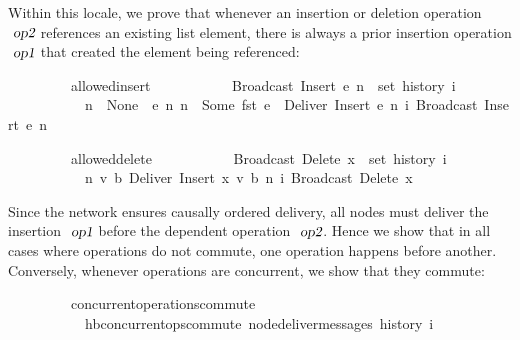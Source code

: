 Within this locale, we prove that whenever an insertion or deletion operation $\isa{op2}$ references an existing list element, there is always a prior insertion operation $\isa{op1}$ that created the element being referenced:
\vspace{0.275em}
\begin{isabellebody}
\ \ \ \ \ \ \ \ \ allowed{\isacharunderscore}insert{\isacharcolon}\isanewline
\ \ \ \ \ \ \ \ \ \ \ {\isachardoublequoteopen}Broadcast\ {\isacharparenleft}Insert\ e\ n{\isacharparenright}\ {\isasymin}\ set\ {\isacharparenleft}history\ i{\isacharparenright}{\isachardoublequoteclose}\isanewline
\ \ \ \ \ \ \ \ \ \ \ {\isachardoublequoteopen}n\ {\isacharequal}\ None\ {\isasymor}\ {\isacharparenleft}{\isasymexists}e{\isacharprime}\ n{\isacharprime}{\isachardot}\ n\ {\isacharequal}\ Some\ {\isacharparenleft}fst\ e{\isacharprime}{\isacharparenright}\ {\isasymand}\ Deliver\ {\isacharparenleft}Insert\ e{\isacharprime}\ n{\isacharprime}{\isacharparenright}\ {\isasymsqsubset}\isactrlsup i\ Broadcast\ {\isacharparenleft}Insert\ e\ n{\isacharparenright}{\isacharparenright}{\isachardoublequoteclose}
\end{isabellebody}
\vspace{0.275em}
\begin{isabellebody}
\ \ \ \ \ \ \ \ \ allowed{\isacharunderscore}delete{\isacharcolon}\isanewline
\ \ \ \ \ \ \ \ \ \ \ {\isachardoublequoteopen}Broadcast\ {\isacharparenleft}Delete\ x{\isacharparenright}\ {\isasymin}\ set\ {\isacharparenleft}history\ i{\isacharparenright}{\isachardoublequoteclose}\isanewline
\ \ \ \ \ \ \ \ \ \ \ {\isachardoublequoteopen}{\isasymexists}n{\isacharprime}\ v\ b{\isachardot}\ Deliver\ {\isacharparenleft}Insert\ {\isacharparenleft}x{\isacharcomma}\ v{\isacharcomma}\ b{\isacharparenright}\ n{\isacharprime}{\isacharparenright}\ {\isasymsqsubset}\isactrlsup i\ Broadcast\ {\isacharparenleft}Delete\ x{\isacharparenright}{\isachardoublequoteclose}
\end{isabellebody}
\vspace{0.275em}
Since the network ensures causally ordered delivery, all nodes must deliver the insertion $\isa{op1}$ before the dependent operation $\isa{op2}$.
Hence we show that in all cases where operations do not commute, one operation happens before another.
Conversely, whenever operations are concurrent, we show that they commute:
\vspace{0.275em}
\begin{isabellebody}
\ \ \ \ \ \ \ \ \ concurrent{\isacharunderscore}operations{\isacharunderscore}commute{\isacharcolon}\isanewline
\ \ \ \ \ \ \ \ \ \ \ {\isachardoublequoteopen}hb{\isachardot}concurrent{\isacharunderscore}ops{\isacharunderscore}commute\ {\isacharparenleft}node{\isacharunderscore}deliver{\isacharunderscore}messages\ {\isacharparenleft}history\ i{\isacharparenright}{\isacharparenright}{\isachardoublequoteclose}
\end{isabellebody}
